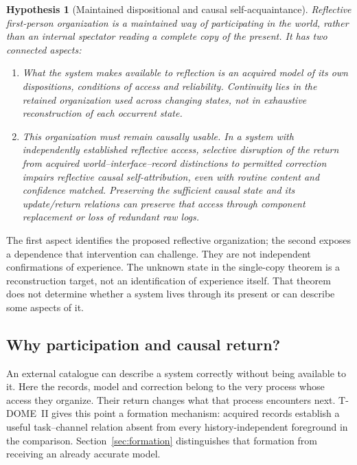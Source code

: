 \documentclass[12pt]{article}
\newtheorem{hypothesis}[theorem]{Hypothesis}
\theoremstyle{definition}
\theoremstyle{remark}
\begin{document}
\begin{hypothesis}[Maintained dispositional and causal self-acquaintance]
\label{hyp:bridge}
\label{hyp:causal_return}
Reflective first-person organization is a maintained way of
participating in the world, rather than an internal spectator
reading a complete copy of the present. It has two connected aspects:
\begin{enumerate}[itemsep=2pt]
\item What the system makes available to reflection is an acquired
model of its own dispositions, conditions of access and reliability.
Continuity lies in the retained organization used across changing
states, not in exhaustive reconstruction of each occurrent state.
\item This organization must remain causally usable. In a system
with independently established reflective access, selective disruption
of the return from acquired world--interface--record distinctions
to permitted correction impairs reflective causal self-attribution,
even with routine content and confidence matched.
Preserving the sufficient causal state and its update/return relations
can preserve that access through component replacement or loss of
redundant raw logs.
\end{enumerate}
\end{hypothesis}

The first aspect identifies the proposed reflective organization;
the second exposes a dependence that intervention can challenge.
They are not independent confirmations of experience.
The unknown state in the single-copy theorem is a reconstruction
target, not an identification of experience itself. That theorem
does not determine whether a system lives through its present
or can describe some aspects of it.

\subsection{Why participation and causal return?}

An external catalogue can describe a system correctly without being
available to it. Here the records, model and correction belong to
the very process whose access they organize. Their return changes
what that process encounters next.
T-DOME~II gives this point a formation mechanism: acquired records
establish a useful task--channel relation absent from every
history-independent foreground in the comparison.
Section~\ref{sec:formation} distinguishes that formation from
receiving an already accurate model.
\end{document}
